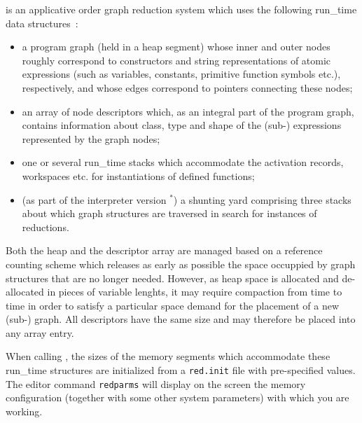 \pired is an {\mys applicative order graph reduction system} which uses
the following {\mys run\_time data structures}~\cite{schm91b,gaer91}:
\begin{itemize}
\item a {\mys program graph} (held in a {\mys heap
segment}) whose inner and outer {\mys nodes} roughly
correspond to {\mys constructors} and string representations of atomic 
expressions (such as variables, constants, primitive function symbols etc.),
respectively, and whose edges correspond to pointers connecting these
nodes;
\item an array of {\mys node descriptors} which, as an integral part
of the program graph, contains information
about {\mys class}, {\mys type} and {\mys shape} of the (sub-) expressions represented by
the graph nodes;
\item one or several {\mys run\_time stacks} which accommodate the {\mys activation records}, {\mys workspaces} etc. for
instantiations of defined functions; 
\item (as part of the interpreter version \pired$^*$)
a {\mys shunting yard} comprising three stacks
about which graph structures are {\mys traversed} in search for instances
 of reductions.
\end{itemize}
Both the heap and the {\mys descriptor array} are managed based on a 
{\mys reference counting scheme} which releases as early as possible
 the space occuppied by graph structures that are no longer needed.
 However, as heap space is allocated and de-allocated in pieces of variable
 lenghts, it may require
compaction from time to time in order to satisfy a particular space
demand for the placement of a new (sub-) graph.
 All descriptors have the same size 
and may therefore be placed into any array entry.

When calling \pired, the sizes of the memory segments which accommodate
these run\_time structures are {\mys initialized} from a {\tt red.init} file
with pre-specified values. The {\mys editor command} {\tt redparms} will display
on the screen the {\mys memory configuration} (together with some other system
parameters) with which you are working.

